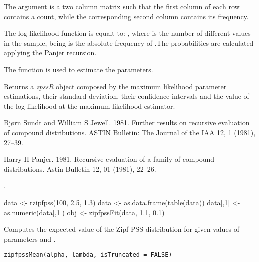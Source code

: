 \documentclass[letterpaper]{book}
\begin{document}
%
\begin{Details}\relax
The argument  is a two column matrix such that the first column of each row contains a
count, while the corresponding second column contains its frequency.

The log-likelihood function is equalt to:
,
where  is the number of different values in the sample, being  is the absolute
frequency of .The probabilities are calculated applying the Panjer recursion.

The function \emph{} is used to estimate the parameters.
\end{Details}
%
\begin{Value}
Returns a \emph{zpssR} object composed by the maximum likelihood parameter estimations,
their standard deviation, their confidence intervals and the value of the log-likelihood at the
maximum likelihood estimator.
\end{Value}
%
\begin{References}\relax

Bjørn Sundt and William S Jewell. 1981. Further results on recursive evaluation of compound distributions. ASTIN
Bulletin: The Journal of the IAA 12, 1 (1981), 27–39.

Harry H Panjer. 1981. Recursive evaluation of a family of compound distributions. Astin Bulletin 12, 01 (1981), 22–26.

\end{References}
%
\begin{SeeAlso}\relax
{}.
\end{SeeAlso}
%
\begin{Examples}
\begin{ExampleCode}
data <- rzipfpss(100, 2.5, 1.3)
data <- as.data.frame(table(data))
data[,1] <- as.numeric(data[,1])
obj <- zipfpssFit(data, 1.1, 0.1)
\end{ExampleCode}
\end{Examples}
%
\begin{Description}\relax
Computes the expected value of the Zipf-PSS distribution for given values of parameters
\eqn{\alpha}{} and \eqn{\lambda}{}.
\end{Description}
%
\begin{Usage}
\begin{verbatim}
zipfpssMean(alpha, lambda, isTruncated = FALSE)
\end{verbatim}
\end{Usage}
\end{document}

